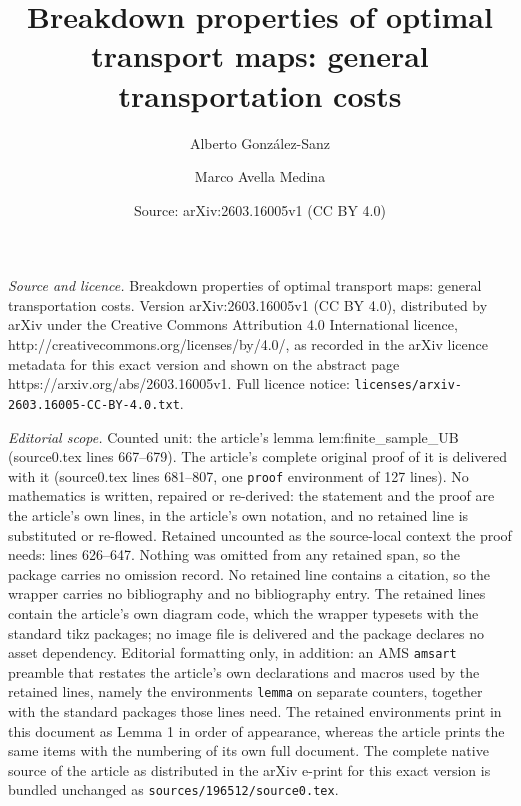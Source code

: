 \documentclass[10pt,a4paper]{amsart}
\title{\huge Breakdown properties of optimal transport maps: general transportation costs}
\author{Alberto Gonz{\'a}lez-Sanz \and Marco Avella Medina}
\date{Source: arXiv:2603.16005v1 (CC BY 4.0)}
\begin{document}
\maketitle

\noindent\emph{Source and licence.} \huge Breakdown properties of optimal transport maps: general transportation costs. Version arXiv:2603.16005v1 (CC BY 4.0), distributed by arXiv under the Creative Commons Attribution 4.0 International licence, http://creativecommons.org/licenses/by/4.0/, as recorded in the arXiv licence metadata for this exact version and shown on the abstract page https://arxiv.org/abs/2603.16005v1. Full licence notice: \texttt{licenses/arxiv-2603.16005-CC-BY-4.0.txt}.\par\smallskip

\noindent\textit{Editorial scope.} Counted unit: the article's lemma lem:finite\_sample\_UB (source0.tex lines 667--679). The article's complete original proof of it is delivered with it (source0.tex lines 681--807, one \texttt{proof} environment of 127 lines). No mathematics is written, repaired or re-derived: the statement and the proof are the article's own lines, in the article's own notation, and no retained line is substituted or re-flowed.  Retained uncounted as the source-local context the proof needs: lines 626--647.  Nothing was omitted from any retained span, so the package carries no omission record.  No retained line contains a citation, so the wrapper carries no bibliography and no bibliography entry.  The retained lines contain the article's own diagram code, which the wrapper typesets with the standard tikz packages; no image file is delivered and the package declares no asset dependency.  Editorial formatting only, in addition: an AMS \texttt{amsart} preamble that restates the article's own declarations and macros used by the retained lines, namely the environments \texttt{lemma} on separate counters, together with the standard packages those lines need.  The retained environments print in this document as Lemma 1 in order of appearance, whereas the article prints the same items with the numbering of its own full document.  The complete native source of the article as distributed in the arXiv e-print for this exact version is bundled unchanged as \texttt{sources/196512/source0.tex}.
\end{document}
